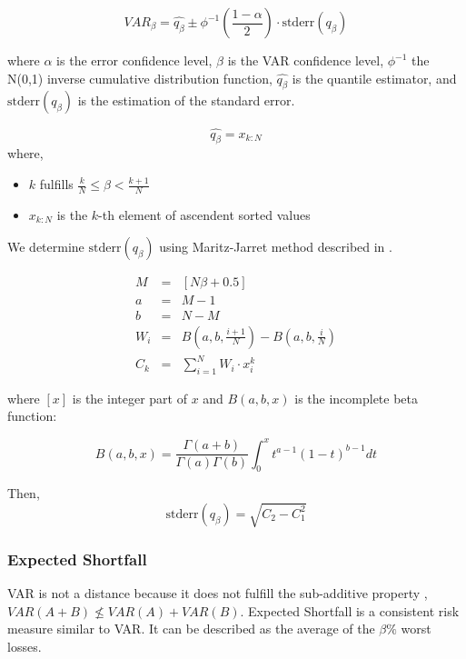 \documentclass[a4paper,12pt,final]{article}
\begin{document}
\begin{displaymath}
VAR_{\beta} = \widehat{q_{\beta}} \pm \phi^{-1}\left(\frac{1-\alpha}{2}\right) \cdot \textrm{stderr}(q_{\beta})
\end{displaymath}

where $\alpha$ is the error confidence level, $\beta$ is the VAR confidence 
level, $\phi^{-1}$ the N(0,1) inverse cumulative distribution function, 
$\widehat{q_{\beta}}$ is the quantile estimator, and $\textrm{stderr}(q_{\beta})$
is the estimation of the standard error.

\begin{displaymath}
\widehat{q_{\beta}} = x_{k:N}
\end{displaymath}
where,
\begin{itemize}
\item $k$ fulfills $\frac{k}{N} \leq \beta < \frac{k+1}{N}$
\item $x_{k:N}$ is the $k$-th element of ascendent sorted values
\end{itemize}

We determine $\textrm{stderr}(q_{\beta})$ using Maritz-Jarret method described
in \cite{quant:algor}.

\begin{eqnarray}
M   & = & [N \beta + 0.5] \nonumber \\
a   & = & M - 1 \nonumber \\
b   & = & N - M \nonumber \\
W_i & = & B(a,b,\frac{i+1}{N}) - B(a,b,\frac{i}{N}) \nonumber \\
C_k & = & \sum_{i=1}^{N} W_i \cdot x_i^k \nonumber
\end{eqnarray}

where $[x]$ is the integer part of $x$ and $B(a,b,x)$ is the incomplete beta 
function:

\begin{displaymath}
B(a,b,x)=\frac{\Gamma(a+b)}{\Gamma(a)\Gamma(b)}\int_0^x t^{a-1} (1-t)^{b-1} dt
\end{displaymath}

Then,
\begin{displaymath}
\textrm{stderr}(q_{\beta}) = \sqrt{C_2 - C_1^2}
\end{displaymath}

\subsubsection{Expected Shortfall}
VAR is not a distance because it does not fulfill the sub-additive property 
\cite{var:varbad}, $VAR(A+B) \nleq VAR(A)+VAR(B)$. Expected Shortfall is a 
consistent risk measure \cite{var:eshortfall} similar to VAR. It can be described
as the average of the $\beta\%$ worst losses.
\end{document}
